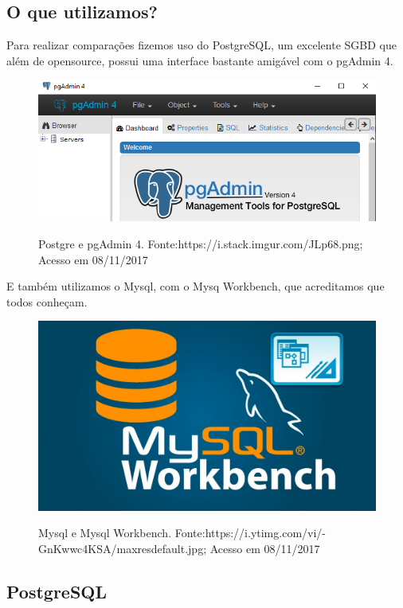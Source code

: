 \documentclass[12pt,a4paper]{article}
\begin{document}
\subsection{O que utilizamos?}
Para realizar comparações fizemos uso do PostgreSQL, um excelente SGBD que além de opensource, possui uma interface bastante amigável com o pgAdmin 4.
\begin{figure}[h]
\centering
\includegraphics[width=15cm]{recursos/imagens/postgre.png}
\label{1}
\caption{Postgre e pgAdmin 4. Fonte:https://i.stack.imgur.com/JLp68.png; Acesso em 08/11/2017}
\end{figure}

E também utilizamos o Mysql, com o Mysq Workbench, que acreditamos que todos conheçam.
\begin{figure}[h]
\centering
\includegraphics[width=15cm]{recursos/imagens/mysql.jpg}
\label{2}
\caption{Mysql e Mysql Workbench. Fonte:https://i.ytimg.com/vi/-GnKwwc4KSA/maxresdefault.jpg; Acesso em 08/11/2017}
\end{figure}

\subsection{PostgreSQL}
\end{document}
